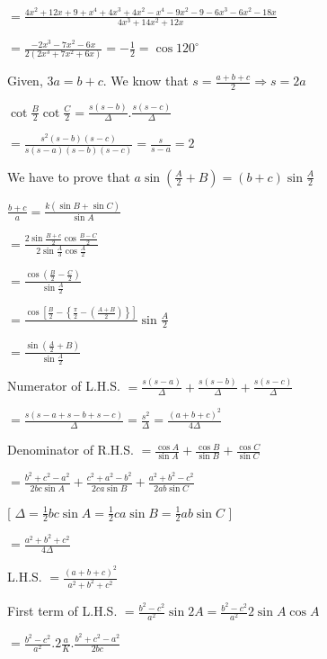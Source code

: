   $= \frac{4x^2 + 12x + 9 + x^4 + 4x^3 + 4x^2 - x^4 - 9x^2 - 9 - 6x^3 - 6x^2 - 18x}{4x^3 + 14x^2 + 12x}$

  $= \frac{-2x^3 -7x^2 - 6x}{2(2x^3 + 7x^2 + 6x)} = -\frac{1}{2} = \cos120^\circ$

\item Given, $3a = b + c.$ We know that $s = \frac{a + b + c}{2} \Rightarrow s = 2a$

  $\cot\frac{B}{2}\cot\frac{C}{2} = \frac{s(s - b)}{\Delta}.\frac{s(s - c)}{\Delta}$

  $=\frac{s^2(s - b)(s - c)}{s(s - a)(s - b)(s - c)} = \frac{s}{s - a} = 2$

\item We have to prove that $a\sin\left(\frac{A}{2} + B\right) = (b + c)\sin\frac{A}{2}$

  $\frac{b + c}{a} = \frac{k(\sin B + \sin C)}{\sin A}$

  $= \frac{2\sin\frac{B + c}{2}\cos\frac{B - C}{2}}{2\sin\frac{A}{3}\cos\frac{A}{2}}$

  $= \frac{\cos\left(\frac{B}{2} - \frac{C}{2}\right)}{\sin\frac{A}{2}}$

  $= \frac{\cos\left[\frac{B}{2} - \left\{\frac{\pi}{2} - \left(\frac{A + B}{2}\right)\right\}\right]}{}\sin\frac{A}{2}$

  $= \frac{\sin\left(\frac{A}{2} + B\right)}{\sin\frac{A}{2}}$

\item Numerator of L.H.S. $= \frac{s(s - a)}{\Delta} + \frac{s(s - b)}{\Delta} + \frac{s(s - c)}{\Delta}$

  $= \frac{s(s - a + s - b + s - c)}{\Delta} = \frac{s^2}{\Delta} = \frac{(a + b + c)^2}{4\Delta}$

  Denominator of R.H.S. $= \frac{\cos A}{\sin A} + \frac{\cos B}{\sin B} + \frac{\cos C}{\sin C}$

  $= \frac{b^2 + c^2 - a^2}{2bc\sin A} + \frac{c^2 + a^2 - b^2}{2ca\sin B} + \frac{a^2 + b^2 - c^2}{2ab\sin C}$

  [ $\Delta = \frac{1}{2}bc\sin A = \frac{1}{2}ca\sin B = \frac{1}{2}ab\sin C$ ]

  $= \frac{a^2 + b^2 + c^2}{4\Delta}$

  L.H.S. $= \frac{(a + b + c)^2}{a^2 + b^2 + c^2}$

\item First term of L.H.S. $= \frac{b^2 - c^2}{a^2}\sin2A = \frac{b^2 - c^2}{a^2}2\sin A\cos A$

  $= \frac{b^2 - c^2}{a^2}.2\frac{a}{K}.\frac{b^2 + c^2 - a^2}{2bc}$

